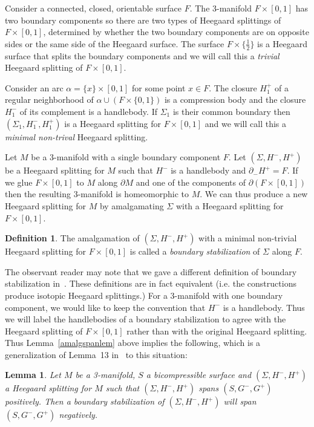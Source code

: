 \documentclass[12pt]{amsart}
\theoremstyle{plain}
\newtheorem{Lem}[Thm]{Lemma}
\theoremstyle{definition}
\newtheorem{Def}[Thm]{Definition}
\begin{document}
Consider a connected, closed, orientable surface $F$.  The 3-manifold $F \times [0,1]$ has two boundary components so there are two types of Heegaard splittings of $F \times [0,1]$, determined by whether the two boundary components are on opposite sides or the same side of the Heegaard surface.  The surface $F \times \{\frac{1}{2}\}$ is a Heegaard surface that splits the boundary components and we will call this a \textit{trivial} Heegaard splitting of $F \times [0,1]$.

Consider an arc $\alpha = \{x\} \times [0,1]$ for some point $x \in F$.  The closure $H_1^+$ of a regular neighborhood of $\alpha \cup (F \times \{0,1\})$ is a compression body and the closure $H_1^-$ of its complement is a handlebody.  If $\Sigma_1$ is their common boundary then $(\Sigma_1, H^-_1, H^+_1)$ is a Heegaard splitting for $F \times [0,1]$ and we will call this a \textit{minimal non-trival} Heegaard splitting.

Let $M$ be a 3-manifold with a single boundary component $F$.  Let $(\Sigma, H^-, H^+)$ be a Heegaard splitting for $M$ such that $H^-$ is a handlebody and $\partial_- H^+ = F$.  If we glue $F \times [0,1]$ to $M$ along $\partial M$ and one of the components of $\partial (F \times [0,1])$ then the resulting 3-manifold is homeomorphic to $M$.  We can thus produce a new Heegaard splitting for $M$ by amalgamating $\Sigma$ with a Heegaard splitting for $F \times [0,1]$.

\begin{Def}
The amalgamation of $(\Sigma, H^-, H^+)$ with a minimal non-trivial Heegaard splitting for $F \times [0,1]$ is called a \textit{boundary stabilization} of $\Sigma$ along $F$.
\end{Def}

The observant reader may note that we gave a different definition of boundary stabilization in~\cite{me:stabs}.  These definitions are in fact equivalent (i.e. the constructions produce isotopic Heegaard splittings.)  For a 3-manifold with one boundary component, we would like to keep the convention that $H^-$ is a handlebody.  Thus we will label the handlebodies of a boundary stabilization to agree with the Heegaard splitting of $F \times [0,1]$ rather than with the original Heegaard splitting.  Thus Lemma~\ref{amalgspanlem} above implies the following, which is a generalization of Lemma~13 in~\cite{me:stabs} to this situation:

\begin{Lem}
\label{bstablspanslem}
Let $M$ be a 3-manifold, $S$ a bicompressible surface and $(\Sigma, H^-, H^+)$ a Heegaard splitting for $M$ such that $(\Sigma, H^-, H^+)$ spans $(S, G^-, G^+)$ positively.  Then a boundary stabilization of $(\Sigma, H^-, H^+)$ will span $(S, G^-, G^+)$ negatively.
\end{Lem}
\end{document}
